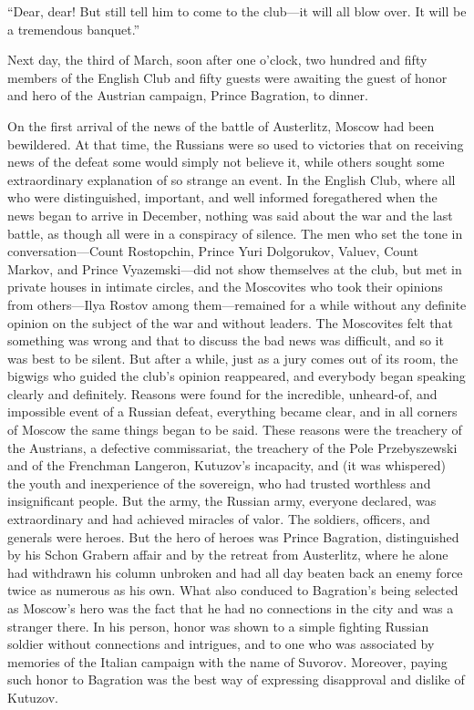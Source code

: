 ``Dear, dear! But still tell him to come to the club---it will
all blow over. It will be a tremendous banquet.''

Next day, the third of March, soon after one o'clock, two hundred
and fifty members of the English Club and fifty guests were
awaiting the guest of honor and hero of the Austrian campaign,
Prince Bagration, to dinner.

On the first arrival of the news of the battle of Austerlitz,
Moscow had been bewildered. At that time, the Russians were so
used to victories that on receiving news of the defeat some would
simply not believe it, while others sought some extraordinary
explanation of so strange an event. In the English Club, where
all who were distinguished, important, and well informed
foregathered when the news began to arrive in December, nothing
was said about the war and the last battle, as though all were in
a conspiracy of silence. The men who set the tone in
conversation---Count Rostopchin, Prince Yuri Dolgorukov, Valuev,
Count Markov, and Prince Vyazemski---did not show themselves at
the club, but met in private houses in intimate circles, and the
Moscovites who took their opinions from others---Ilya Rostov
among them---remained for a while without any definite opinion on
the subject of the war and without leaders. The Moscovites felt
that something was wrong and that to discuss the bad news was
difficult, and so it was best to be silent. But after a while,
just as a jury comes out of its room, the bigwigs who guided the
club's opinion reappeared, and everybody began speaking clearly
and definitely. Reasons were found for the incredible,
unheard-of, and impossible event of a Russian defeat, everything
became clear, and in all corners of Moscow the same things began
to be said. These reasons were the treachery of the Austrians, a
defective commissariat, the treachery of the Pole Przebyszewski
and of the Frenchman Langeron, Kutuzov's incapacity, and (it was
whispered) the youth and inexperience of the sovereign, who had
trusted worthless and insignificant people.  But the army, the
Russian army, everyone declared, was extraordinary and had
achieved miracles of valor. The soldiers, officers, and generals
were heroes. But the hero of heroes was Prince Bagration,
distinguished by his Schon Grabern affair and by the retreat from
Austerlitz, where he alone had withdrawn his column unbroken and
had all day beaten back an enemy force twice as numerous as his
own. What also conduced to Bagration's being selected as Moscow's
hero was the fact that he had no connections in the city and was
a stranger there. In his person, honor was shown to a simple
fighting Russian soldier without connections and intrigues, and
to one who was associated by memories of the Italian campaign
with the name of Suvorov. Moreover, paying such honor to
Bagration was the best way of expressing disapproval and dislike
of Kutuzov.

